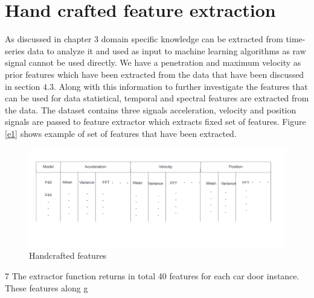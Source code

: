    \section{Hand crafted feature extraction}  
   
    As discussed in chapter 3 domain specific knowledge can be extracted from time-series data to analyze it and used as input to machine learning algorithms as raw signal cannot be used directly. We have a penetration and maximum velocity as prior features which have been extracted from the data that have been discussed in section $4.3$. Along with this information to further investigate the features that can be used for data statistical, temporal and spectral features are extracted from the data. The dataset contains three signals acceleration, velocity and position signals are passed to feature extractor which extracts fixed set of features. Figure \ref{e1} shows example of set of features that have been extracted.
    
      \begin{figure}[h]
      	\centering
      	\includegraphics[width=1\linewidth]{images/hcf.png}
      	\caption{Handcrafted features }
      	\label{n0}
      \end{figure}
       7
    The extractor function returns in total 40 features for each car door instance. These features along g
      

